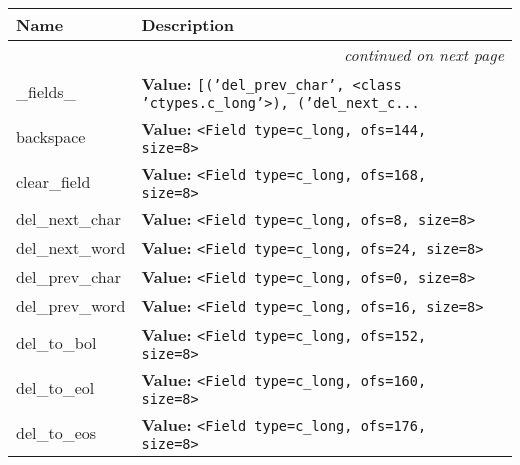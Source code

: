    \vspace{-1cm}
\hspace{\varindent}\begin{longtable}{|p{\varnamewidth}|p{\vardescrwidth}|l}
\cline{1-2}
\cline{1-2} \centering \textbf{Name} & \centering \textbf{Description}& \\
\cline{1-2}
\endhead\cline{1-2}\multicolumn{3}{r}{\small\textit{continued on next page}}\\\endfoot\cline{1-2}
\endlastfoot\raggedright \_\-f\-i\-e\-l\-d\-s\-\_\- & \raggedright \textbf{Value:} 
{\tt \texttt{[}\texttt{(}\texttt{'}\texttt{del\_prev\_char}\texttt{'}\texttt{, }{\textless}class 'ctypes.c\_long'{\textgreater}\texttt{)}\texttt{, }\texttt{(}\texttt{'}\texttt{del\_next\_c}\texttt{...}}&\\
\cline{1-2}
\raggedright b\-a\-c\-k\-s\-p\-a\-c\-e\- & \raggedright \textbf{Value:} 
{\tt {\textless}Field type=c\_long, ofs=144, size=8{\textgreater}}&\\
\cline{1-2}
\raggedright c\-l\-e\-a\-r\-\_\-f\-i\-e\-l\-d\- & \raggedright \textbf{Value:} 
{\tt {\textless}Field type=c\_long, ofs=168, size=8{\textgreater}}&\\
\cline{1-2}
\raggedright d\-e\-l\-\_\-n\-e\-x\-t\-\_\-c\-h\-a\-r\- & \raggedright \textbf{Value:} 
{\tt {\textless}Field type=c\_long, ofs=8, size=8{\textgreater}}&\\
\cline{1-2}
\raggedright d\-e\-l\-\_\-n\-e\-x\-t\-\_\-w\-o\-r\-d\- & \raggedright \textbf{Value:} 
{\tt {\textless}Field type=c\_long, ofs=24, size=8{\textgreater}}&\\
\cline{1-2}
\raggedright d\-e\-l\-\_\-p\-r\-e\-v\-\_\-c\-h\-a\-r\- & \raggedright \textbf{Value:} 
{\tt {\textless}Field type=c\_long, ofs=0, size=8{\textgreater}}&\\
\cline{1-2}
\raggedright d\-e\-l\-\_\-p\-r\-e\-v\-\_\-w\-o\-r\-d\- & \raggedright \textbf{Value:} 
{\tt {\textless}Field type=c\_long, ofs=16, size=8{\textgreater}}&\\
\cline{1-2}
\raggedright d\-e\-l\-\_\-t\-o\-\_\-b\-o\-l\- & \raggedright \textbf{Value:} 
{\tt {\textless}Field type=c\_long, ofs=152, size=8{\textgreater}}&\\
\cline{1-2}
\raggedright d\-e\-l\-\_\-t\-o\-\_\-e\-o\-l\- & \raggedright \textbf{Value:} 
{\tt {\textless}Field type=c\_long, ofs=160, size=8{\textgreater}}&\\
\cline{1-2}
\raggedright d\-e\-l\-\_\-t\-o\-\_\-e\-o\-s\- & \raggedright \textbf{Value:} 
{\tt {\textless}Field type=c\_long, ofs=176, size=8{\textgreater}}&\\

\end{longtable}
